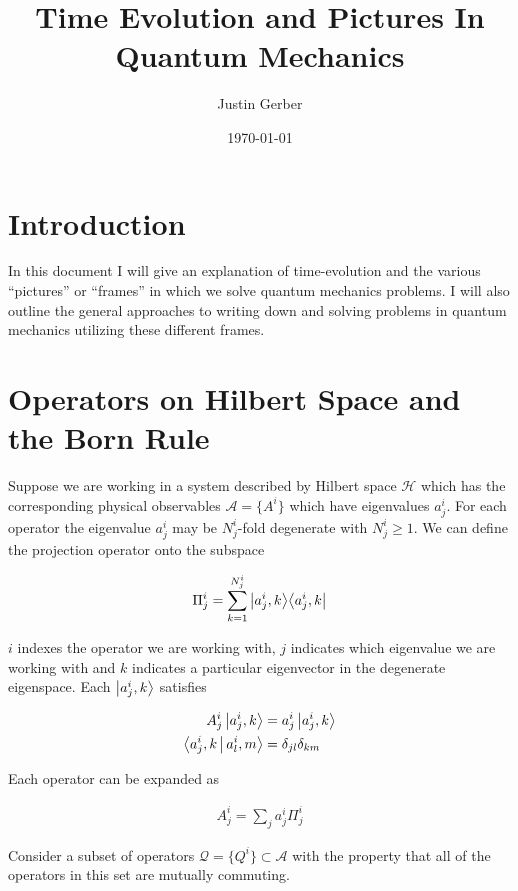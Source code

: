 \documentclass[12pt]{article}
\newcommand{\ketbra}[2]{\Ket{#1}\!\Bra{#2}}
\begin{document}
\title{Time Evolution and Pictures In Quantum Mechanics}
\author{Justin Gerber}
\date{\today}
\maketitle


\section{Introduction}


In this document I will give an explanation of time-evolution and the various ``pictures'' or ``frames'' in which we solve quantum mechanics problems. I will also outline the general approaches to writing down and solving problems in quantum mechanics utilizing these different frames.


\section{Operators on Hilbert Space and the Born Rule}


Suppose we are working in a system described by Hilbert space $\mathcal{H}$ which has the corresponding physical observables $\mathcal{A} = \{A^i\}$ which have eigenvalues $a^i_j$. For each operator the eigenvalue $a^i_j$ may be $N^i_j$-fold degenerate with $N^i_j \ge 1$. We can define the projection operator onto the subspace

\begin{align}
\Pi^i_j = \sum_{k=1}^{N^i_j} \ketbra{a^i_j,k}{a^i_j,k}
\end{align}

$i$ indexes the operator we are working with, $j$ indicates which eigenvalue we are working with and $k$ indicates a particular eigenvector in the degenerate eigenspace. Each $\Ket{a^i_j,k}$ satisfies

\begin{align}
A^i_j\Ket{a^i_j,k} &= a^i_j \Ket{a^i_j,k}\\
\Braket{a^i_j,k|a^i_l,m} &= \delta_{jl}\delta_{km}
\end{align}

Each operator can be expanded as

\begin{align}
A^i_j = \sum_j a^i_j \Pi^i_j
\end{align}

Consider a subset of operators $\mathcal{Q} = \{Q^i\}\subset \mathcal{A}$ with the property that all of the operators in this set are mutually commuting.
\end{document}
